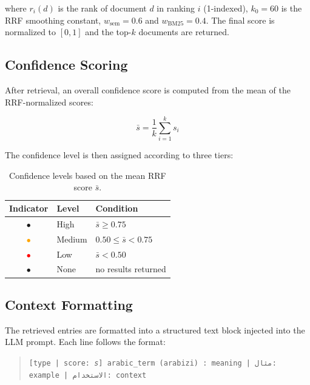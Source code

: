 \noindent where $r_i(d)$ is the rank of document $d$ in ranking $i$ (1-indexed),
$k_0 = 60$ is the RRF smoothing constant, $w_{\text{sem}} = 0.6$ and
$w_{\text{BM25}} = 0.4$. The final score is normalized to $[0,1]$ and the top-$k$
documents are returned.

\subsection{Confidence Scoring}
\label{subsec:confidence}

After retrieval, an overall confidence score is computed from the mean of the
RRF-normalized scores:

\begin{equation}
    \bar{s} = \frac{1}{k} \sum_{i=1}^{k} s_i
    \label{eq:mean_score}
\end{equation}

The confidence level is then assigned according to three tiers:

\begin{table}[htbp]
\centering
\begin{tabular}{@{} c l l @{}}
\toprule
\textbf{Indicator} & \textbf{Level} & \textbf{Condition} \\
\midrule
\textcolor{green!60!black}{$\bullet$} & High   & $\bar{s} \geq 0.75$ \\
\textcolor{orange}{$\bullet$}         & Medium & $0.50 \leq \bar{s} < 0.75$ \\
\textcolor{red}{$\bullet$}            & Low    & $\bar{s} < 0.50$ \\
$\bullet$                             & None   & no results returned \\
\bottomrule
\end{tabular}
\caption{Confidence levels based on the mean RRF score $\bar{s}$.}
\label{tab:confidence}
\end{table}

\subsection{Context Formatting}
\label{subsec:context}

The retrieved entries are formatted into a structured text block injected into the
LLM prompt. Each line follows the format:

\begin{quote}
\texttt{[type | score: \textit{s}] arabic\_term (arabizi) : meaning | \textnormal{مثال:} example | \textnormal{الاستخدام:} context}
\end{quote}

